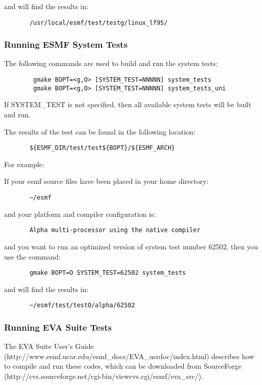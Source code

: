 and will find the results in:
\begin{verbatim}
       /usr/local/esmf/test/testg/linux_lf95/
\end{verbatim}

\subsubsection{Running ESMF System Tests}
\label{RunSystemTests}

The following commands are used to build and run the system tests:

\begin{verbatim}
        gmake BOPT=<g,O> [SYSTEM_TEST=NNNNN] system_tests
        gmake BOPT=<g,O> [SYSTEM_TEST=NNNNN] system_tests_uni
\end{verbatim}

If SYSTEM\_TEST is not specified, then all available system tests will be built and run.

The results of the test can be found in the following location:
\begin{verbatim}
       ${ESMF_DIR/test/test${BOPT}/${ESMF_ARCH}
\end{verbatim}

For example: 

If your esmf source files have been placed in your home directory:
\begin{verbatim}
       ~/esmf
\end{verbatim}

and your platform and compiler configuration is:
\begin{verbatim}
       Alpha multi-processor using the native compiler
\end{verbatim}

and you want to run an optimized version of system test number 62502,
then you use the command:
\begin{verbatim}
       gmake BOPT=O SYSTEM_TEST=62502 system_tests
\end{verbatim}

and will find the results in:
\begin{verbatim}
       ~/esmf/test/testO/alpha/62502 
\end{verbatim}

\subsubsection{Running EVA Suite Tests}
\label{RunEVATests}

The EVA Suite User's Guide (http://www.esmf.ucar.edu/esmf\_docs/EVA\_usrdoc/index.html) describes how to compile and run these codes, which can be downloaded from SourceForge (http://cvs.sourceforge.net/cgi-bin/viewcvs.cgi/esmf/eva\_src/). 




























